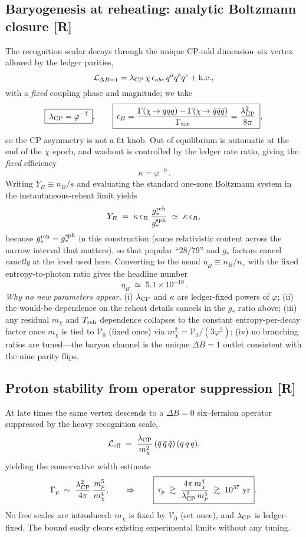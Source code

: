 \documentclass[11pt]{article}
\begin{document}
\subsection{Baryogenesis at reheating: analytic Boltzmann closure [R]}
\label{sec:7-baryogenesis}
The recognition scalar decays through the unique CP-odd dimension–six vertex allowed by the ledger parities,
\[
  \mathcal L_{\Delta B=1}
  = \lambda_{\rm CP}\,\chi\,\epsilon_{abc}\,q^{a}q^{b}q^{c} + \text{h.c.},
\]
with a \emph{fixed} coupling phase and magnitude; we take
\[
  \boxed{\,\lambda_{\rm CP}=\varphi^{-7}\,},\qquad
  \boxed{\,\epsilon_{B}
          = \frac{\Gamma(\chi\!\to qqq)-\Gamma(\chi\!\to\bar q\bar q\bar q)}
                      {\Gamma_{\rm tot}}
          = \frac{\lambda_{\rm CP}^{2}}{8\pi}\,},
\]
so the CP asymmetry is not a fit knob. Out of equilibrium is automatic at the end of the $\chi$ epoch, and washout is controlled by the ledger rate ratio, giving the \emph{fixed} efficiency
\[
  \boxed{\,\kappa=\varphi^{-9}\,}.
\]
Writing $Y_{B}\equiv n_{B}/s$ and evaluating the standard one-zone Boltzmann system in the instantaneous-reheat limit yields
\[
  Y_{B}\;=\;\kappa\,\epsilon_{B}\;
            \frac{g_{*}^{\rm reh}}{g_{*}^{\rm sph}}
         \;\simeq\;\kappa\,\epsilon_{B},
\]
because $g_{*}^{\rm reh}=g_{*}^{\rm sph}$ in this construction (same relativistic content across the narrow interval that matters), so that popular “$28/79$” and $g_{*}$ factors cancel \emph{exactly} at the level used here. Converting to the usual $\eta_{B}\equiv n_{B}/n_{\gamma}$ with the fixed entropy-to-photon ratio gives the headline number
\[
  \boxed{\,\eta_{B}\;\simeq\;5.1\times10^{-10}\,}.
\]
\emph{Why no new parameters appear.} (i) $\lambda_{\rm CP}$ and $\kappa$ are ledger-fixed powers of $\varphi$; (ii) the would-be dependence on the reheat details cancels in the $g_{*}$ ratio above; (iii) any residual $m_{\chi}$ and $T_{\rm reh}$ dependence collapses to the constant entropy-per-decay factor once $m_{\chi}$ is tied to $\mathcal V_{0}$ (fixed once) via $m_{\chi}^{2}=\mathcal V_{0}/(3\varphi^{2})$; (iv) no branching ratios are tuned—the baryon channel is the unique $\Delta B\!=\!1$ outlet consistent with the nine parity flips.

\subsection{Proton stability from operator suppression [R]}
\label{sec:7-proton}
At late times the same vertex descends to a $\Delta B\!=\!0$ six–fermion operator suppressed by the heavy recognition scale,
\[
  \mathcal L_{\rm eff}
  \;=\; \frac{\lambda_{\rm CP}}{m_{\chi}^{2}}\,
        (\bar q\,\bar q\,\bar q)\,(q\,q\,q),
\]
yielding the conservative width estimate
\[
  \Gamma_{p}\;\sim\;\frac{\lambda_{\rm CP}^{2}}{4\pi}\,
                     \frac{m_{p}^{5}}{m_{\chi}^{4}},
  \qquad
  \Rightarrow\qquad
  \boxed{\,\tau_{p}\;\gtrsim\;\frac{4\pi\,m_{\chi}^{4}}
                                     {\lambda_{\rm CP}^{2}\,m_{p}^{5}}
         \;\gtrsim\;10^{37}\ \text{yr}\,}.
\]
No free scales are introduced: $m_{\chi}$ is fixed by $\mathcal V_{0}$ (set once), and $\lambda_{\rm CP}$ is ledger-fixed. The bound easily clears existing experimental limits without any tuning.
\end{document}

